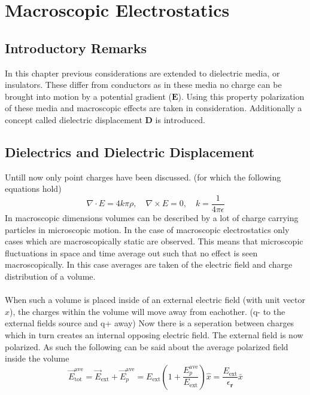 \chapter{Macroscopic Electrostatics}
\section{Introductory Remarks}
In this chapter previous considerations are extended to dielectric media, or insulators.
These differ from conductors as in these media no charge can be brought into motion by a potential gradient ($\textbf{E}$).
Using this property polarization of these media and macroscopic effects are taken in consideration. Additionally a concept called dielectric displacement $\textbf{D}$ is introduced.

\section{Dielectrics and Dielectric Displacement}
Untill now only point charges have been discussed. (for which the following equations hold)
\begin{equation}
    \nabla \cdot E = 4k\pi\rho, \quad \nabla \times E = 0, \quad k = \frac{1}{4\pi \epsilon}
\end{equation}
In macroscopic dimensions volumes can be described by a lot of charge carrying particles in microscopic motion. In the case of macroscopic electrostatics only cases which are macroscopically static are observed. 
This means that microscopic fluctuations in space and time average out such that no effect is seen macroscopically.
In this case averages are taken of the electric field and charge distribution of a volume.\\
\\
\noindent When such a volume is placed inside of an external electric field (with unit vector $\hat{x}$), the charges within the volume will move away from eachother. (q- to the external fields source and q+ away)
Now there is a seperation between charges which in turn creates an internal opposing electric field. The external field is now polarized. As such the following can be said about the average polarized field inside the volume  
\begin{equation}
    \vec{E}_{\text {tot}}^{\text {ave}}=\vec{E}_{\text {ext}}+\vec{E}_{p}^{\text {ave}}=E_{\text {ext}}\left(1+\frac{E_{p}^{\text {ave}}}{E_{\text {ext}}}\right) \hat{x}=\frac{E_{\text {ext}}}{\epsilon_{\boldsymbol{r}}} \bar{x}
\end{equation}
